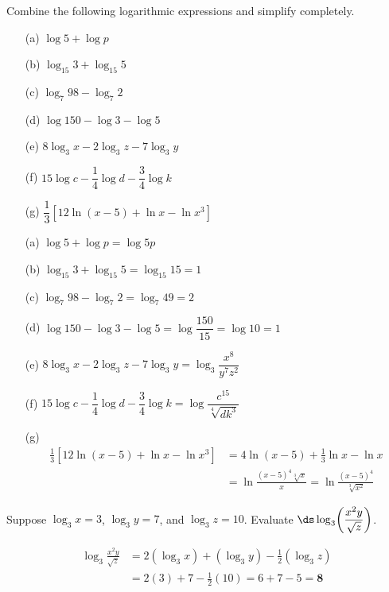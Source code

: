 \documentclass{ximera}
\begin{document}
\begin{problem}
Combine the following logarithmic expressions and simplify completely.
\begin{enumerate}
  \item[(a)] $\log 5 + \log p$
  \medskip
  \item[(b)] $\log_{15} 3 + \log_{15} 5$
  \medskip
  \item[(c)] $\log_7 98 - \log_7 2$
  \medskip
  \item[(d)] $\log 150 - \log 3 - \log 5$
  \medskip
  \item[(e)] $8\log_3 x - 2\log_3 z - 7\log_3 y$
  \medskip
  \item[(f)] $15\log c - \dfrac{1}{4}\log d - \dfrac{3}{4}\log k$
  \medskip
  \item[(g)] $\dfrac{1}{3}\!\left[ 12\ln(x-5)+\ln x - \ln x^3 \right]$
\end{enumerate}

\begin{solution}
\begin{enumerate}
  \item[(a)] $\log 5 + \log p = \log 5p$

  \item[(b)] $\log_{15} 3 + \log_{15} 5 = \log_{15} 15 = 1$

  \item[(c)] $\log_7 98 - \log_7 2 = \log_7 49 = 2$

  \item[(d)] $\log 150 - \log 3 - \log 5 = \log\dfrac{150}{15} = \log 10 = 1$

  \item[(e)] $8\log_3 x - 2\log_3 z - 7\log_3 y = \log_3\dfrac{x^8}{y^7z^2}$

  \item[(f)] $15\log c - \dfrac{1}{4}\log d - \dfrac{3}{4}\log k = \log\dfrac{c^{15}}{\sqrt[4]{dk^3}}$

  \item[(g)]
  \begin{align*}
    \tfrac{1}{3}\!\left[12\ln(x-5)+\ln x - \ln x^3\right] &= 4\ln(x-5) + \tfrac{1}{3}\ln x - \ln x\\
    &= \ln\frac{(x-5)^4\sqrt[3]{x}}{x} = \ln\frac{(x-5)^4}{\sqrt[3]{x^2}}
  \end{align*}
\end{enumerate}
\end{solution}
\end{problem}


\begin{problem}
Suppose $\log_3 x = 3$, $\log_3 y = 7$, and $\log_3 z = 10$. Evaluate $\ds\log_3\!\left(\dfrac{x^2y}{\sqrt{z}}\right)$.

\begin{solution}
\begin{align*}
  \log_3\frac{x^2y}{\sqrt{z}} &= 2(\log_3 x) + (\log_3 y) - \tfrac{1}{2}(\log_3 z)\\
  &= 2(3) + 7 - \tfrac{1}{2}(10) = 6 + 7 - 5 = \mathbf{8}
\end{align*}
\end{solution}
\end{problem}
\end{document}
